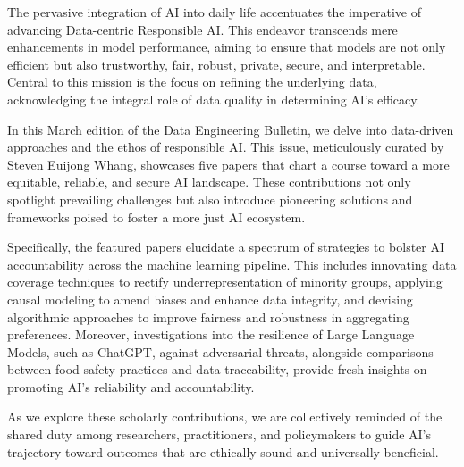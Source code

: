 \documentclass[11pt]{article}
\begin{document}
The pervasive integration of AI into daily life accentuates the
imperative of advancing Data-centric Responsible AI. This endeavor
transcends mere enhancements in model performance, aiming to ensure
that models are not only efficient but also trustworthy, fair, robust,
private, secure, and interpretable. Central to this mission is the
focus on refining the underlying data, acknowledging the integral role
of data quality in determining AI's efficacy.

In this March edition of the Data Engineering Bulletin, we delve into
data-driven approaches and the ethos of responsible AI. This issue,
meticulously curated by Steven Euijong Whang, showcases five papers
that chart a course toward a more equitable, reliable, and secure AI
landscape. These contributions not only spotlight prevailing
challenges but also introduce pioneering solutions and frameworks
poised to foster a more just AI ecosystem.

Specifically, the featured papers elucidate a spectrum of strategies
to bolster AI accountability across the machine learning
pipeline. This includes innovating data coverage techniques to rectify
underrepresentation of minority groups, applying causal modeling to
amend biases and enhance data integrity, and devising algorithmic
approaches to improve fairness and robustness in aggregating
preferences. Moreover, investigations into the resilience of Large
Language Models, such as ChatGPT, against adversarial threats,
alongside comparisons between food safety practices and data
traceability, provide fresh insights on promoting AI's reliability and
accountability.

As we explore these scholarly contributions, we are collectively
reminded of the shared duty among researchers, practitioners, and
policymakers to guide AI's trajectory toward outcomes that are
ethically sound and universally beneficial.
\end{document}
